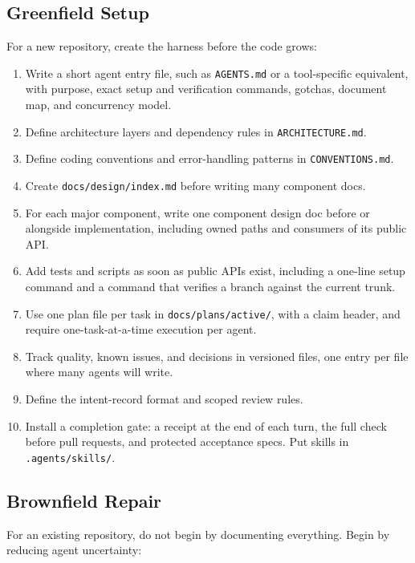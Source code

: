 \documentclass[11pt]{article}
\begin{document}
\subsection{Greenfield Setup}
For a new repository, create the harness before the code grows:

\begin{enumerate}[leftmargin=*]
  \item Write a short agent entry file, such as \texttt{AGENTS.md} or a tool-specific equivalent, with purpose, exact setup and verification commands, gotchas, document map, and concurrency model.
  \item Define architecture layers and dependency rules in \texttt{ARCHITECTURE.md}.
  \item Define coding conventions and error-handling patterns in \texttt{CONVENTIONS.md}.
  \item Create \texttt{docs/design/index.md} before writing many component docs.
  \item For each major component, write one component design doc before or alongside implementation, including owned paths and consumers of its public API.
  \item Add tests and scripts as soon as public APIs exist, including a one-line setup command and a command that verifies a branch against the current trunk.
  \item Use one plan file per task in \texttt{docs/plans/active/}, with a claim header, and require one-task-at-a-time execution per agent.
  \item Track quality, known issues, and decisions in versioned files, one entry per file where many agents will write.
  \item Define the intent-record format and scoped review rules.
  \item Install a completion gate: a receipt at the end of each turn, the full check before pull requests, and protected acceptance specs. Put skills in \texttt{.agents/skills/}.
\end{enumerate}

\subsection{Brownfield Repair}
For an existing repository, do not begin by documenting everything. Begin by reducing agent uncertainty:
\end{document}
